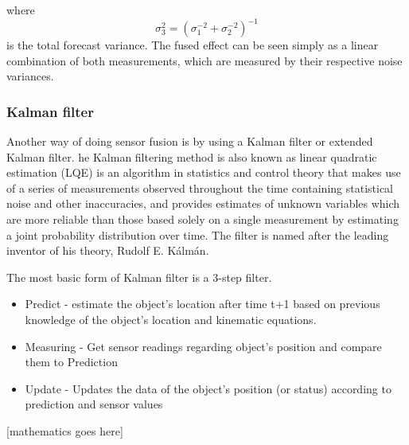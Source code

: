 where  \begin{equation}\sigma_{3}^{2}=\left(\sigma_{1}^{-2}+\sigma_{2}^{-2}\right)^{-1}\end{equation} is the total forecast variance. The fused effect can be seen simply as a linear combination of both measurements, which are measured by their respective noise variances.


\subsubsection{Kalman filter}

Another way of doing sensor fusion is by using a Kalman filter or extended Kalman filter. he Kalman filtering method is also known as linear quadratic estimation (LQE) is an algorithm in statistics and control theory that makes use of a series of measurements observed throughout the time containing statistical noise and other inaccuracies, and provides estimates of unknown variables which are more reliable than those based solely on a single measurement by estimating a joint probability distribution over time. The filter is named after the leading inventor of his theory, Rudolf E. Kálmán.

The most basic form of Kalman filter is a 3-step filter.
\begin{itemize}
 \item Predict - estimate the object's location after time t+1 based on previous knowledge of the object's location and kinematic equations.
 \item Measuring - Get sensor readings regarding object's position and compare them to Prediction
 \item Update - Updates the data of the object's position (or status) according to prediction and sensor values
\end{itemize}


[mathematics goes here]



